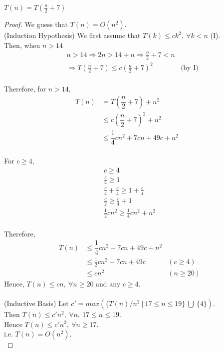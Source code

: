 \documentclass[12pt]{article}
\newenvironment{question}[2][Question]{\begin{trivlist}
\item[\hskip \labelsep {\bfseries #1}\hskip \labelsep {\bfseries #2.}]}{\end{trivlist}}
\begin{document}
\begin{question}{6} $T(n)  = T(\frac{n}{2} + 7)$
  \begin{proof}
    We guess that $T(n) = O(n^{2})$.\\
    (Induction Hypothesis) We first assume that $T(k) \leq ck^{2},\ \forall k < n$ (I).\\
    Then, when $n > 14$
    \begin{align*}
      & n > 14 \Rightarrow 2n > 14 + n \Rightarrow \frac{n}{2} + 7 < n &\\
      & \Rightarrow T(\frac{n}{2} + 7) \leq c(\frac{n}{2} + 7)^{2} & \text{(by I)}\\
    \end{align*}

    Therefore, for $ n > 14$,
    \begin{align*}
      T(n) & = T(\dfrac{n}{2} + 7) + n^{2}               &\\
           & \leq c(\dfrac{n}{2} + 7)^{2} + n^{2}        &\\
           & \leq \dfrac{1}{4}cn^{2} + 7cn + 49c + n^{2} &\\
    \end{align*}

    For $c \geq 4$,
    \begin{align*}
      & c \geq 4           &\\
      & \frac{c}{4} \geq 1 &\\
      & \frac{c}{4} + \frac{c}{4} \geq 1 + \frac{c}{4} &\\
      & \frac{c}{2} \geq \frac{c}{4} + 1 &\\
      & \frac{1}{2}cn^{2} \geq \frac{1}{4}cn^{2} + n^{2} &\\
    \end{align*}

    Therefore,
    \begin{align*}
      T(n) & \leq \dfrac{1}{4}cn^{2} + 7cn + 49c + n^{2} &\\
           & \leq \frac{1}{2}cn^{2} + 7cn + 49c & (c \geq 4)\\
           & \leq cn^{2} & (n \geq 20)
    \end{align*}
    Hence, $T(n) \leq cn,\ \forall n \geq 20$ and any $c \geq 4$.\\ \\
    (Inductive Basis) Let $c' = max(\{T(n)/n^{2}\ |\ 17 \leq n \leq 19\}\ \bigcup\ \{4\})$.\\
    Then $T(n) \leq c'n^{2},\ \forall n,\ 17 \leq n \leq 19$.\\
    Hence $T(n) \leq c'n^{2},\ \forall n \geq 17$.\\
    i.e. $T(n) = O(n^{2})$.\\
  \end{proof}
\end{question}
\end{document}
